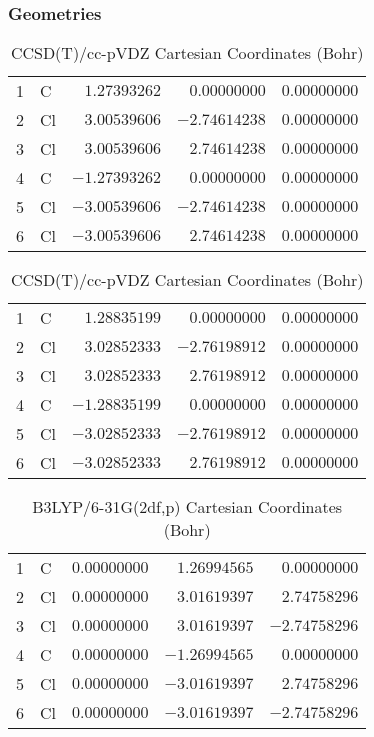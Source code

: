 \documentclass[10pt,oneside]{article}
\begin{document}
\begin{table}[h!]
\subsubsection*{Geometries}
\begin{multicols}{2}
\centering
\caption{CCSD(T)/cc-pVTZ Cartesian Coordinates (Bohr)}
\begin{tabular}{llrrr}
\toprule
1  & C  & $ 1.27393262$ & $ 0.00000000$ & $ 0.00000000$ \\
2  & Cl & $ 3.00539606$ & $-2.74614238$ & $ 0.00000000$ \\
3  & Cl & $ 3.00539606$ & $ 2.74614238$ & $ 0.00000000$ \\
4  & C  & $-1.27393262$ & $ 0.00000000$ & $ 0.00000000$ \\
5  & Cl & $-3.00539606$ & $-2.74614238$ & $ 0.00000000$ \\
6  & Cl & $-3.00539606$ & $ 2.74614238$ & $ 0.00000000$ \\
\bottomrule
\end{tabular}
\caption{CCSD(T)/cc-pVDZ Cartesian Coordinates (Bohr)}
\begin{tabular}{llrrr}
\toprule
1  & C  & $ 1.28835199$ & $ 0.00000000$ & $ 0.00000000$ \\
2  & Cl & $ 3.02852333$ & $-2.76198912$ & $ 0.00000000$ \\
3  & Cl & $ 3.02852333$ & $ 2.76198912$ & $ 0.00000000$ \\
4  & C  & $-1.28835199$ & $ 0.00000000$ & $ 0.00000000$ \\
5  & Cl & $-3.02852333$ & $-2.76198912$ & $ 0.00000000$ \\
6  & Cl & $-3.02852333$ & $ 2.76198912$ & $ 0.00000000$ \\
\bottomrule
\end{tabular}
\end{multicols}
\end{table}

\begin{table}[h]
\centering
\caption{B3LYP/6-31G(2df,p) Cartesian Coordinates (Bohr)}
\begin{tabular}{llrrr}
\toprule
1  & C  & $ 0.00000000$ & $ 1.26994565$ & $ 0.00000000$ \\
2  & Cl & $ 0.00000000$ & $ 3.01619397$ & $ 2.74758296$ \\
3  & Cl & $ 0.00000000$ & $ 3.01619397$ & $-2.74758296$ \\
4  & C  & $ 0.00000000$ & $-1.26994565$ & $ 0.00000000$ \\
5  & Cl & $ 0.00000000$ & $-3.01619397$ & $ 2.74758296$ \\
6  & Cl & $ 0.00000000$ & $-3.01619397$ & $-2.74758296$ \\
\bottomrule
\end{tabular}
\end{table}
\end{document}
